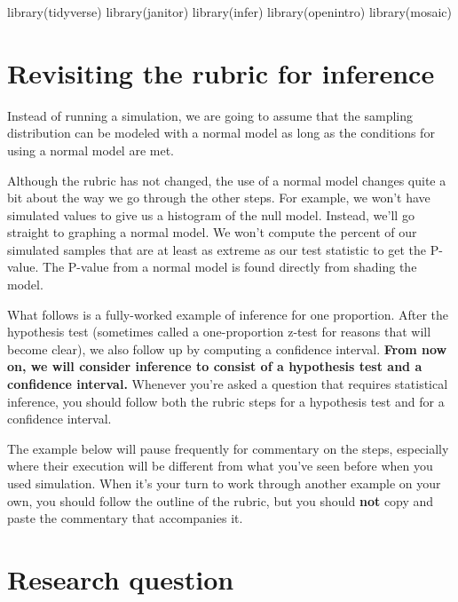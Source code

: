 \documentclass[
]{book}
\newenvironment{Shaded}{\begin{snugshade}}{\end{snugshade}}
\newcommand{\FunctionTok}[1]{\textcolor[rgb]{0.00,0.00,0.00}{#1}}
\newcommand{\NormalTok}[1]{#1}
\begin{document}
\begin{Shaded}
\begin{Highlighting}[]
\FunctionTok{library}\NormalTok{(tidyverse)}
\FunctionTok{library}\NormalTok{(janitor)}
\FunctionTok{library}\NormalTok{(infer)}
\FunctionTok{library}\NormalTok{(openintro)}
\FunctionTok{library}\NormalTok{(mosaic)}
\end{Highlighting}
\end{Shaded}

\hypertarget{one-prop-rubric}{%
\section{Revisiting the rubric for inference}\label{one-prop-rubric}}

Instead of running a simulation, we are going to assume that the sampling distribution can be modeled with a normal model as long as the conditions for using a normal model are met.

Although the rubric has not changed, the use of a normal model changes quite a bit about the way we go through the other steps. For example, we won't have simulated values to give us a histogram of the null model. Instead, we'll go straight to graphing a normal model. We won't compute the percent of our simulated samples that are at least as extreme as our test statistic to get the P-value. The P-value from a normal model is found directly from shading the model.

What follows is a fully-worked example of inference for one proportion. After the hypothesis test (sometimes called a one-proportion z-test for reasons that will become clear), we also follow up by computing a confidence interval. \textbf{From now on, we will consider inference to consist of a hypothesis test and a confidence interval.} Whenever you're asked a question that requires statistical inference, you should follow both the rubric steps for a hypothesis test and for a confidence interval.

The example below will pause frequently for commentary on the steps, especially where their execution will be different from what you've seen before when you used simulation. When it's your turn to work through another example on your own, you should follow the outline of the rubric, but you should \textbf{not} copy and paste the commentary that accompanies it.

\hypertarget{one-prop-question}{%
\section{Research question}\label{one-prop-question}}
\end{document}
